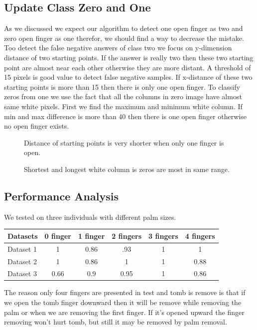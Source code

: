 \subsection{Update Class Zero and One}
As we discussed we expect our algorithm to detect one open finger as two and zero open finger as one therefor, we should find a way to decrease the mistake. Too detect the false negative answers of class two we focus on y-dimension distance of two starting points. If the answer is really two then these two starting point are almost near each other otherwise they are more distant. A threshold of 15 pixels is good value to detect false negative samples. If x-distance of these two starting points is more than 15 then there is only one open finger. \newline
To classify zeros from one we use the fact that all the columns in zero image have almost same white pixels. First we find the maximum and minimum white column. If min and max difference is more than 40 then there is one open finger otherwise no open finger exists.
\begin{figure}
\caption{Distance of starting points is very shorter when only one finger is open.}
\end{figure}
\begin{figure}
\caption{Shortest and longest white column is zeros are most in same range.}
\end{figure}


\subsection{Performance Analysis}
We tested on three individuals with different palm sizes. \newline
\begin{center}


\begin{tabular}{|l| c| c| c| c| c|} \hline
  Datasets & 0 finger & 1 finger & 2 fingers & 3 fingers & 4 fingers  \\ \hline
  Dataset 1 & 1 & 0.86 & .93 & 1 & 1  \\ \hline
  Dataset 2 & 1 & 0.86 & 1 & 1 & 0.88  \\ \hline
  Dataset 3 & 0.66 & 0.9 & 0.95 & 1 & 0.86  \\ \hline
\end{tabular}
\end{center} 
The reason only four fingers are presented in test and tomb is remove is that if we open the tomb finger downward then it will be remove while removing the palm or when we are removing the first finger. If it's opened upward the finger removing won't hurt tomb, but still it may be removed by palm removal.
